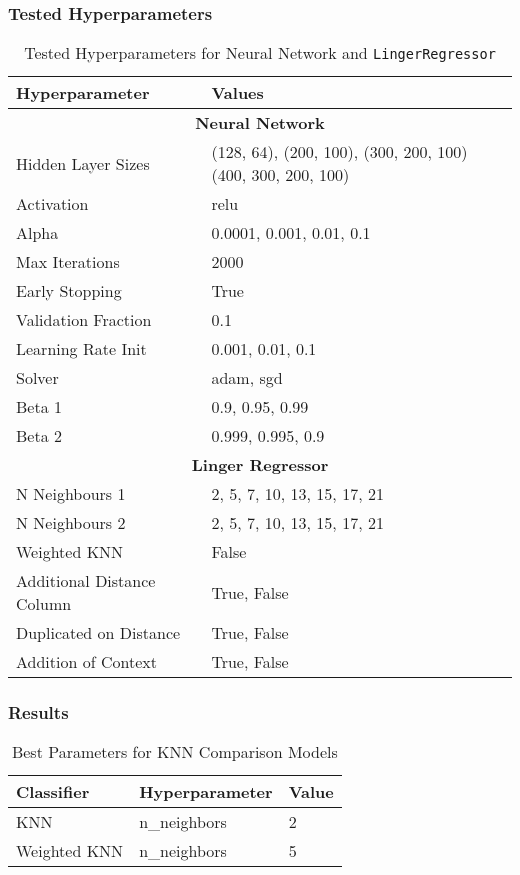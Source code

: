 \documentclass[a4paper, 12pt]{report}
\begin{document}
\subsubsection{Tested Hyperparameters}

\begin{table}[H]
    \centering
    \caption{Tested Hyperparameters for Neural Network and \texttt{LingerRegressor}}
    \label{tab:hyperparameters_abalone}
    \begin{tabular}{|l|l|}
    \hline
    \textbf{Hyperparameter} & \textbf{Values} \\ \hline
    \multicolumn{2}{|c|}{\textbf{Neural Network}} \\ \hline
    Hidden Layer Sizes &  (128, 64), (200, 100), (300, 200, 100) (400, 300, 200, 100)\\ \hline
    Activation & relu \\ \hline
    Alpha & 0.0001, 0.001, 0.01, 0.1 \\ \hline
    Max Iterations & 2000 \\ \hline
    Early Stopping & True \\ \hline
    Validation Fraction & 0.1 \\ \hline
    Learning Rate Init & 0.001, 0.01, 0.1 \\ \hline
    Solver & adam, sgd \\ \hline
    Beta 1 & 0.9, 0.95, 0.99 \\ \hline
    Beta 2 & 0.999, 0.995, 0.9 \\ \hline
    \multicolumn{2}{|c|}{\textbf{Linger Regressor}} \\ \hline
    N Neighbours 1 & 2, 5, 7, 10, 13, 15, 17, 21 \\ \hline
    N Neighbours 2 & 2, 5, 7, 10, 13, 15, 17, 21 \\ \hline
    Weighted KNN & False \\ \hline
    Additional Distance Column & True, False \\ \hline
    Duplicated on Distance & True, False \\ \hline
    Addition of Context & True, False \\ \hline
    \end{tabular}
\end{table}
\clearpage

\subsubsection{Results}


\begin{table}[H]
    \centering
    \caption{Best Parameters for KNN Comparison Models}
    \label{tab:best_parameters_combined_knn_exp2}
    \begin{tabular}{|l|l|l|}
    \toprule
    \textbf{Classifier} & \textbf{Hyperparameter} & \textbf{Value} \\
    \midrule
    KNN & n\_neighbors & 2 \\
    Weighted KNN & n\_neighbors & 5 \\
    \bottomrule
\end{tabular}
\end{table}
\end{document}
